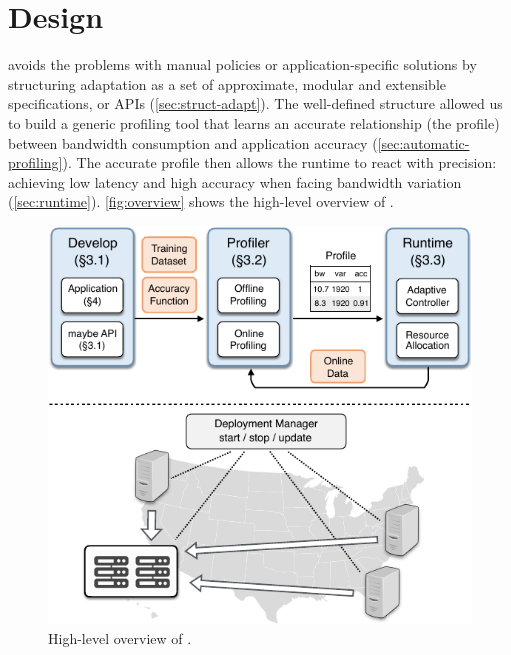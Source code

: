 \section{\sysname{} Design}
\label{sec:system}

\sysname{} avoids the problems with manual policies or application-specific
solutions by structuring adaptation as a set of approximate, modular and
extensible specifications, or APIs (\autoref{sec:struct-adapt}). The
well-defined structure allowed us to build a generic profiling tool that learns
an accurate relationship (the profile) between bandwidth consumption and
application accuracy (\autoref{sec:automatic-profiling}). The accurate profile
then allows the runtime to react with precision: achieving low latency and high
accuracy when facing bandwidth variation
(\autoref{sec:runtime}). \autoref{fig:overview} shows the high-level overview of
\sysname{}.

\begin{figure}
  \centering
  \includegraphics[width=.9\linewidth]{figures/system.pdf}
  \caption{High-level overview of \sysname{}.}
  \label{fig:overview}
\end{figure}





\newpage
\clearpage


